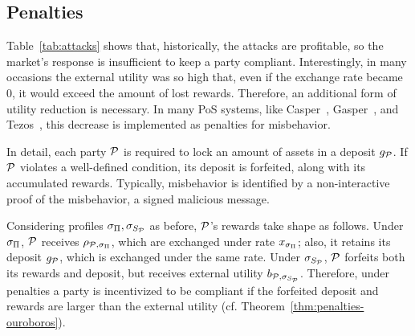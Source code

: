 \subsection{Penalties}

Table~\ref{tab:attacks} shows that, historically, the attacks are profitable,
so the market's response is insufficient to keep a party compliant.
Interestingly, in many occasions the external utility was so high that, even if
the exchange rate became $0$, it would exceed the amount of lost rewards.
Therefore, an additional form of utility reduction is necessary. In many PoS
systems, like
Casper~\cite{buterin2017casper,casper-incentives},
Gasper~\cite{buterin2020combining}, and Tezos~\cite{tezos-pos},
this decrease is implemented as penalties for misbehavior.

In detail, each party $\mathcal{P}$ is required to lock an amount of assets in a
deposit $g_{\mathcal{P}}$. If $\mathcal{P}$ violates a well-defined condition, its
deposit is forfeited, along with its accumulated rewards. Typically,
misbehavior is identified by a non-interactive proof of the misbehavior, \eg a
signed malicious message.

Considering profiles $\sigma_\Pi, \sigma_{S_{\mathcal{P}}}$ as
before, $\mathcal{P}$'s rewards take shape as follows. Under $\sigma_\Pi$,
$\mathcal{P}$ receives $\rho_{\mathcal{P}, \sigma_\Pi}$, which are exchanged
under rate $x_{\sigma_\Pi}$; also, it retains its deposit
$g_{\mathcal{P}}$, which is exchanged under the same rate. Under
$\sigma_{S_{\mathcal{P}}}$, $\mathcal{P}$ forfeits both its rewards and deposit, but
receives external utility $b_{\mathcal{P}, \sigma_{S_{\mathcal{P}}}}$.
Therefore, under penalties a party is incentivized to be compliant if
the forfeited deposit and rewards are larger than the external utility
(cf. Theorem~\ref{thm:penalties-ouroboros}).

